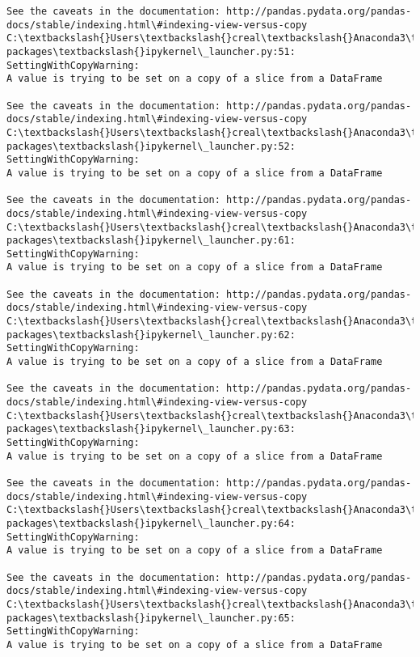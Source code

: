 \documentclass[11pt]{article}
\begin{document}
\begin{Verbatim}[commandchars=\\\{\}]
See the caveats in the documentation: http://pandas.pydata.org/pandas-docs/stable/indexing.html\#indexing-view-versus-copy
C:\textbackslash{}Users\textbackslash{}creal\textbackslash{}Anaconda3\textbackslash{}lib\textbackslash{}site-packages\textbackslash{}ipykernel\_launcher.py:51: SettingWithCopyWarning: 
A value is trying to be set on a copy of a slice from a DataFrame

See the caveats in the documentation: http://pandas.pydata.org/pandas-docs/stable/indexing.html\#indexing-view-versus-copy
C:\textbackslash{}Users\textbackslash{}creal\textbackslash{}Anaconda3\textbackslash{}lib\textbackslash{}site-packages\textbackslash{}ipykernel\_launcher.py:52: SettingWithCopyWarning: 
A value is trying to be set on a copy of a slice from a DataFrame

See the caveats in the documentation: http://pandas.pydata.org/pandas-docs/stable/indexing.html\#indexing-view-versus-copy
C:\textbackslash{}Users\textbackslash{}creal\textbackslash{}Anaconda3\textbackslash{}lib\textbackslash{}site-packages\textbackslash{}ipykernel\_launcher.py:61: SettingWithCopyWarning: 
A value is trying to be set on a copy of a slice from a DataFrame

See the caveats in the documentation: http://pandas.pydata.org/pandas-docs/stable/indexing.html\#indexing-view-versus-copy
C:\textbackslash{}Users\textbackslash{}creal\textbackslash{}Anaconda3\textbackslash{}lib\textbackslash{}site-packages\textbackslash{}ipykernel\_launcher.py:62: SettingWithCopyWarning: 
A value is trying to be set on a copy of a slice from a DataFrame

See the caveats in the documentation: http://pandas.pydata.org/pandas-docs/stable/indexing.html\#indexing-view-versus-copy
C:\textbackslash{}Users\textbackslash{}creal\textbackslash{}Anaconda3\textbackslash{}lib\textbackslash{}site-packages\textbackslash{}ipykernel\_launcher.py:63: SettingWithCopyWarning: 
A value is trying to be set on a copy of a slice from a DataFrame

See the caveats in the documentation: http://pandas.pydata.org/pandas-docs/stable/indexing.html\#indexing-view-versus-copy
C:\textbackslash{}Users\textbackslash{}creal\textbackslash{}Anaconda3\textbackslash{}lib\textbackslash{}site-packages\textbackslash{}ipykernel\_launcher.py:64: SettingWithCopyWarning: 
A value is trying to be set on a copy of a slice from a DataFrame

See the caveats in the documentation: http://pandas.pydata.org/pandas-docs/stable/indexing.html\#indexing-view-versus-copy
C:\textbackslash{}Users\textbackslash{}creal\textbackslash{}Anaconda3\textbackslash{}lib\textbackslash{}site-packages\textbackslash{}ipykernel\_launcher.py:65: SettingWithCopyWarning: 
A value is trying to be set on a copy of a slice from a DataFrame


\end{Verbatim}
\end{document}
